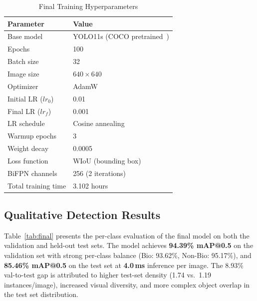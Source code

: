 \documentclass[runningheads]{llncs}
\begin{document}
\begin{table}[H]
\centering
\caption{Final Training Hyperparameters}
\label{tab:training}
\begin{tabular}{ll}
\toprule
\textbf{Parameter}     & \textbf{Value} \\
\midrule
Base model             & YOLO11s (COCO pretrained~\cite{lin2014coco}) \\
Epochs                 & 100 \\
Batch size             & 32 \\
Image size             & $640 \times 640$ \\
Optimizer              & AdamW~\cite{loshchilov2019adamw} \\
Initial LR ($lr_0$)    & 0.01 \\
Final LR ($lr_f$)      & 0.001 \\
LR schedule            & Cosine annealing \\
Warmup epochs          & 3 \\
Weight decay           & 0.0005 \\
Loss function          & WIoU (bounding box) \\
BiFPN channels         & 256 (2 iterations) \\
Total training time    & 3.102 hours \\
\bottomrule
\end{tabular}
\end{table}

\subsection{Qualitative Detection Results}

Table~\ref{tab:final} presents the per-class evaluation of the final model
on both the validation and held-out test sets. The model achieves
\textbf{94.39\% mAP@0.5} on the validation set with strong per-class
balance (Bio: 93.62\%, Non-Bio: 95.17\%), and \textbf{85.46\% mAP@0.5}
on the test set at \textbf{4.0\,ms} inference per image. The 8.93\% val-to-test gap is attributed to higher test-set density
(1.74 vs.\ 1.19 instances/image), increased visual diversity, and
more complex object overlap in the test set distribution.
\end{document}
